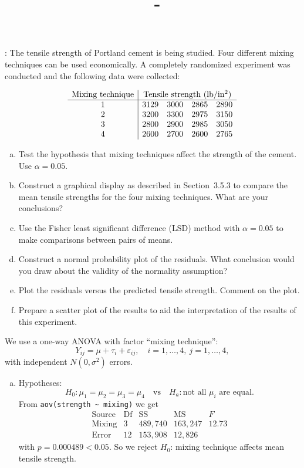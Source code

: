 \documentclass[answers,12pt,addpoints]{exam}
\author{\name}
\title{\course \ - \assignment}
\begin{document}
\maketitle
\begin{questions}
:
The tensile strength of Portland cement is being studied. Four different mixing
techniques can be used economically. A completely randomized experiment was
conducted and the following data were collected:

\[
\begin{array}{c|cccc}
\text{Mixing technique} & \multicolumn{4}{c}{\text{Tensile strength (lb/in$^2$)}}\\
\hline
1 & 3129 & 3000 & 2865 & 2890\\
2 & 3200 & 3300 & 2975 & 3150\\
3 & 2800 & 2900 & 2985 & 3050\\
4 & 2600 & 2700 & 2600 & 2765
\end{array}
\]

\begin{enumerate}[(a)]
\item Test the hypothesis that mixing techniques affect the strength of the cement. Use $\alpha = 0.05$.
\item Construct a graphical display as described in Section~3.5.3 to compare the mean tensile strengths for the four mixing techniques. What are your conclusions?
\item Use the Fisher least significant difference (LSD) method with $\alpha = 0.05$ to make comparisons between pairs of means.
\item Construct a normal probability plot of the residuals. What conclusion would you draw about the validity of the normality assumption?
\item Plot the residuals versus the predicted tensile strength. Comment on the plot.
\item Prepare a scatter plot of the results to aid the interpretation of the results of this experiment.
\end{enumerate}

\begin{solution}
We use a one-way ANOVA with factor “mixing technique”:
\[
Y_{ij} = \mu + \tau_i + \varepsilon_{ij},\quad i=1,\dots,4,\ j=1,\dots,4,
\]
with independent $N(0,\sigma^2)$ errors.

\begin{enumerate}[(a)]
\item Hypotheses:
\[
H_0:\mu_1=\mu_2=\mu_3=\mu_4
\quad\text{vs}\quad
H_a:\text{not all }\mu_i\text{ are equal}.
\]
From \verb|aov(strength ~ mixing)| we get
\[
\begin{array}{l|rrrr}
\text{Source} & \text{Df} & \text{SS} & \text{MS} & F \\
\hline
\text{Mixing} & 3 & 489{,}740 & 163{,}247 & 12.73 \\
\text{Error}  & 12 & 153{,}908 & 12{,}826 &
\end{array}
\]
with $p = 0.000489 < 0.05$. So we reject $H_0$: mixing technique affects mean tensile strength.


\end{enumerate}
\end{solution}
\end{questions}
\end{document}
